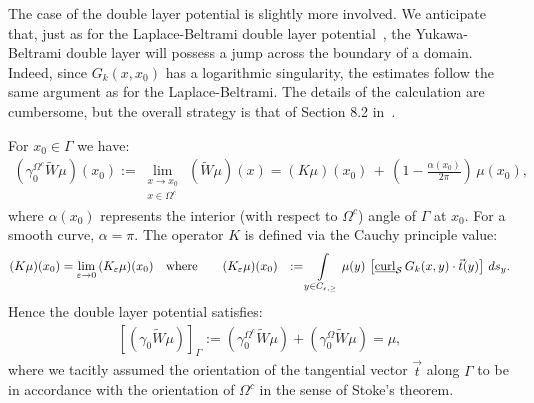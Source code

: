 \documentclass[final]{siamltex}
\renewcommand{\S} {\mathcal{S}}
\begin{document}
The case of the double layer potential is slightly more involved. We
anticipate that, just as for the Laplace-Beltrami double layer
potential~\cite{gemmrich}, the Yukawa-Beltrami double layer will
possess a jump across the boundary of a domain.  Indeed, since
$G_k(x,x_0)$ has a logarithmic singularity, the estimates follow the
same argument as for the Laplace-Beltrami. The details of the
calculation are cumbersome, but the overall strategy is that of Section
8.2 in~\cite{hackbusch}.


\begin{lemma}
For $x_0\in\Gamma$ we have:
\begin{align} 
\label{DLPjump}
(\gamma^{\Omega^{c}}_0\widetilde
W\mu)(x_0):=\lim\limits_{\substack{x \to x_0 \\ x \in \Omega^{c}}}\,(\widetilde{W}\mu)(x) = (K\mu)(x_0)\,+\,\left(1-\frac{\alpha(x_0)}{2\pi}\right)\,\mu(x_0),
\end{align}
where $\alpha(x_0)$ represents the interior (with respect to
$\Omega^{c}$) angle of $\Gamma$ at $x_0$. For a smooth curve, $\alpha = \pi$. The operator $K$ is defined via the Cauchy principle value: 
\begin{align}
(K\mu)(x_0)&=\lim_{\varepsilon\rightarrow 0}\, (K_{\varepsilon}\mu)(x_0)
\quad \mbox{where}\qquad
(K_{\varepsilon}\mu)(x_0)&:=\int\limits_{y\in C_{\epsilon,\geq}} 
\mu(y)\,\left[\underline{\mbox{curl}}_{\S}\,G_k(x,y)\cdot\vec{t}(y)\right]\,ds_{y}.\notag
\end{align}
Hence  the double layer potential satisfies:
\begin{align}
\left[(\gamma_0\widetilde W\mu)
\right]_\Gamma:=(\gamma^{\Omega^{c}}_0\widetilde W\mu)+(\gamma^{\Omega}_0\widetilde W\mu)=\mu,
\end{align}
where we tacitly assumed the orientation of the tangential vector
$\vec{t}$ along $\Gamma$ to be in accordance with the orientation of
$\Omega^{c}$ in the sense of Stoke's theorem.
\end{lemma}
\end{document}
